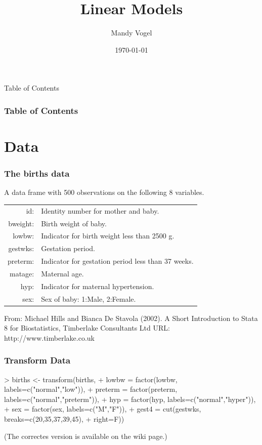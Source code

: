 \documentclass[xcolor={table}]{beamer}
\begin{document}
\title{Linear Models}   
\author{Mandy Vogel} 
\date{\today}


\begin{frame}
\titlepage
\end{frame}

\begin{frame}{Table of Contents}
\frametitle{Table of Contents}\tableofcontents
\end{frame}

\section{Data}
\begin{frame}\frametitle{The births data}
A data frame with 500 observations on the following 8 variables. 
\begin{center}
\begin{tabular}{@{} >{\ttfamily}r l}
             id: & Identity number for mother and baby.               \\
       bweight: & Birth weight of baby.                              \\
         lowbw: & Indicator for birth weight less than 2500 g.       \\
       gestwks: & Gestation period.                                  \\
       preterm: & Indicator for gestation period less than 37 weeks. \\
        matage: & Maternal age.                                      \\
           hyp: & Indicator for maternal hypertension.               \\
           sex: & Sex of baby: 1:Male, 2:Female.                     \\
\end{tabular}
\end{center}
From: Michael Hills and Bianca De Stavola (2002). A Short Introduction
     to Stata 8 for Biostatistics, Timberlake Consultants Ltd URL:
     http://www.timberlake.co.uk
\end{frame}

\begin{frame}[fragile]\frametitle{Transform Data}
\small
\begin{semiverbatim}
> births <- transform(births,
+       lowbw = factor(lowbw, labels=c("normal","low")),
+       preterm = factor(preterm, labels=c("normal","preterm")),
+       hyp = factor(hyp, labels=c("normal","hyper")),
+       sex = factor(sex, labels=c("M","F")),
+       gest4 = cut(gestwks, breaks=c(20,35,37,39,45),
+       right=F))
\end{semiverbatim}
(The correctes version is available on the wiki page.)
\end{frame}
\end{document}
